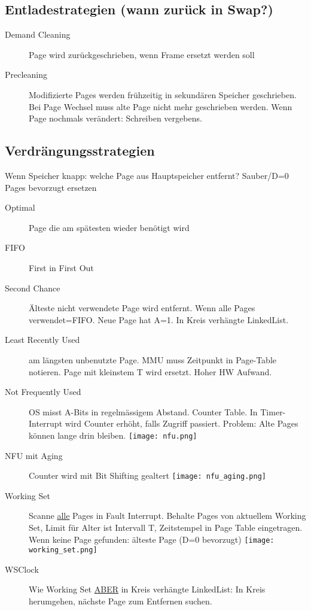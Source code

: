 \begin{multicols*}{4}
\subsection{Entladestrategien (wann zurück in Swap?)}
\begin{description}
    \item[Demand Cleaning] Page wird zurückgeschrieben, wenn Frame ersetzt werden soll
    \item[Precleaning] Modifizierte Pages werden frühzeitig in sekundären Speicher geschrieben.
    Bei Page Wechsel muss alte Page nicht mehr geschrieben werden. Wenn Page nochmals verändert: Schreiben vergebens.
\end{description}

\subsection{Verdrängungsstrategien}
Wenn Speicher knapp: welche Page aus Hauptspeicher entfernt? Sauber/D=0 Pages bevorzugt ersetzen

\begin{description}
    \item[Optimal] Page die am spätesten wieder benötigt wird
    \item[FIFO] First in First Out
    \item[Second Chance] Älteste nicht verwendete Page wird entfernt. Wenn alle Pages verwendet=FIFO. Neue Page hat A=1. In Kreis verhängte LinkedList.
    \item[Least Recently Used] am längsten unbenutzte Page. MMU muss Zeitpunkt in Page-Table notieren. Page mit kleinstem T wird ersetzt. Hoher HW Aufwand.
    \item[Not Frequently Used] OS misst A-Bits in regelmässigem Abstand. Counter Table. In Timer-Interrupt wird Counter erhöht, falls Zugriff passiert. Problem: Alte Pages können lange drin bleiben.  \texttt{[image: nfu.png]}
    \item[NFU mit Aging] Counter wird mit Bit Shifting gealtert \texttt{[image: nfu\_aging.png]}
    \item[Working Set] Scanne \underline{alle} Pages in Fault Interrupt. Behalte Pages von aktuellem Working Set, Limit für Alter ist Intervall T, Zeitstempel in Page Table eingetragen. Wenn keine Page gefunden: älteste Page (D=0 bevorzugt)
    \texttt{[image: working\_set.png]}
    \item[WSClock] Wie Working Set \underline{ABER} in Kreis verhängte LinkedList: In Kreis herumgehen, nächste Page zum Entfernen suchen.
\end{description}


\end{multicols*}
